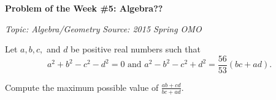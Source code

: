 \begin{potw}\vspace{5pt}
{\large\textbf{Problem of the Week \#5: Algebra??}}\vspace{5pt}

\textit{Topic: Algebra/Geometry}\newline
\textit{Source: 2015 Spring OMO}
\V

Let $a,b,c,$ and $d$ be positive real numbers such that 
\[a^2+b^2-c^2-d^2=0\text{ and } a^2-b^2-c^2+d^2=\frac{56}{53}(bc+ad).\]

Compute the maximum possible value of $\frac{ab+cd}{bc+ad}$.
\end{potw}\V

